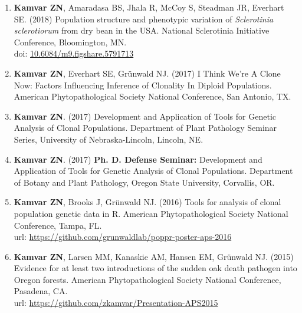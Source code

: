 \begin{enumerate}[leftmargin = 14pt]

	\item \textbf{Kamvar ZN}, Amaradasa BS, Jhala R, McCoy S, Steadman JR,
	Everhart SE. (2018) Population structure and phenotypic variation of
	\textit{Sclerotinia sclerotiorum} from dry bean in the USA. National Sclerotinia Initiative Conference, Bloomington, MN.\\
	doi: \href{https://doi.org/10.6084/m9.figshare.5791713}{10.6084/m9.figshare.5791713}

	\vspace{3pt}

	\item \textbf{Kamvar ZN}, Everhart SE, Gr\"unwald NJ. (2017) I Think We're
	A Clone Now: Factors Influencing Inference of Clonality In Diploid
	Populations. American Phytopathological Society National Conference,
	San Antonio, TX.

	\vspace{3pt}

	\item \textbf{Kamvar ZN}. (2017) Development and Application of Tools
	for Genetic Analysis of Clonal Populations. Department of Plant Pathology
	Seminar Series, University of Nebraska-Lincoln, Lincoln, NE.

	\vspace{3pt}

	\item \textbf{Kamvar ZN}. (2017) \textbf{Ph. D. Defense Seminar:} Development and
	Application of Tools for Genetic Analysis of Clonal Populations. Department
	of Botany and Plant Pathology, Oregon State University, Corvallis, OR.

	\vspace{3pt}

	\item \textbf{Kamvar ZN}, Brooks J, Gr\"unwald NJ. (2016) Tools for analysis
	of clonal population genetic data in R. American Phytopathological Society
	National Conference, Tampa, FL.\\
	url: \href{https://github.com/grunwaldlab/poppr-poster-aps-2016#readme}{https://github.com/grunwaldlab/poppr-poster-aps-2016}

	\vspace{3pt}

	\item \textbf{Kamvar ZN}, Larsen MM, Kanaskie AM, Hansen EM, Gr\"unwald NJ.
	(2015) Evidence for at least two introductions of the sudden oak death
	pathogen into Oregon forests. American Phytopathological Society National
	Conference, Pasadena, CA. \\
	url: \href{https://github.com/zkamvar/Presentation-APS2015#readme}{https://github.com/zkamvar/Presentation-APS2015}


\end{enumerate}
